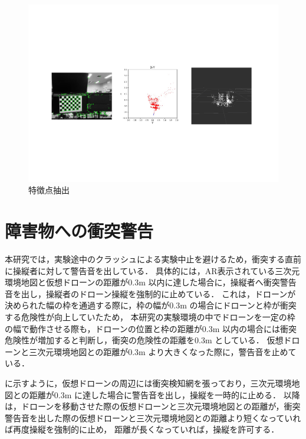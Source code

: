 \documentclass[a4paper,11pt]{ujreport}
\begin{document}
\begin{figure}[!tb]
  \centering
  \includegraphics[width=\linewidth]{img/04_feature.pdf}
  \caption{特徴点抽出}
  \label{fig:04_feature}
\end{figure}



\section{障害物への衝突警告}
\label{sec:CollisionWarning}

本研究では，実験途中のクラッシュによる実験中止を避けるため，衝突する直前に操縦者に対して警告音を出している．
具体的には，AR表示されている三次元環境地図と仮想ドローンの距離が0.3m 以内に達した場合に，操縦者へ衝突警告音を出し，操縦者のドローン操縦を強制的に止めている．
これは，ドローンが決められた幅の枠を通過する際に，枠の幅が0.3m の場合にドローンと枠が衝突する危険性が向上していたため\cite{tech-01}，
本研究の実験環境の中でドローンを一定の枠の幅で動作させる際も，ドローンの位置と枠の距離が0.3m 以内の場合には衝突危険性が増加すると判断し，衝突の危険性の距離を0.3m としている．
仮想ドローンと三次元環境地図との距離が0.3m より大きくなった際に，警告音を止めている．

に示すように，仮想ドローンの周辺には衝突検知網を張っており，三次元環境地図との距離が0.3m に達した場合に警告音を出し，操縦を一時的に止める．
以降は，ドローンを移動させた際の仮想ドローンと三次元環境地図との距離が，衝突警告音を出した際の仮想ドローンと三次元環境地図との距離より短くなっていれば再度操縦を強制的に止め，
距離が長くなっていれば，操縦を許可する．
\end{document}
